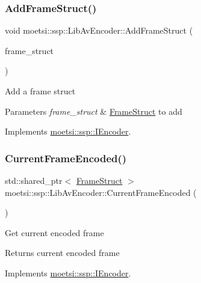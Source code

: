 \subsubsection{\texorpdfstring{Add\+Frame\+Struct()}{AddFrameStruct()}}
{\footnotesize\ttfamily void moetsi\+::ssp\+::\+Lib\+Av\+Encoder\+::\+Add\+Frame\+Struct (\begin{DoxyParamCaption}\item[{std\+::shared\+\_\+ptr$<$ \hyperlink{structmoetsi_1_1ssp_1_1FrameStruct}{Frame\+Struct} $>$ \&}]{frame\+\_\+struct }\end{DoxyParamCaption})\hspace{0.3cm}{\ttfamily [virtual]}}

Add a frame struct 
\begin{DoxyParams}{Parameters}
{\em frame\+\_\+struct} & \hyperlink{structmoetsi_1_1ssp_1_1FrameStruct}{Frame\+Struct} to add \\
\hline
\end{DoxyParams}


Implements \hyperlink{classmoetsi_1_1ssp_1_1IEncoder_a8c223ec82fdd30ee8ee75157306054ec}{moetsi\+::ssp\+::\+I\+Encoder}.

\mbox{\label{classmoetsi_1_1ssp_1_1LibAvEncoder_aedb37703d73b55f1389a122d2ecbe923}} 
\subsubsection{\texorpdfstring{Current\+Frame\+Encoded()}{CurrentFrameEncoded()}}
{\footnotesize\ttfamily std\+::shared\+\_\+ptr$<$ \hyperlink{structmoetsi_1_1ssp_1_1FrameStruct}{Frame\+Struct} $>$ moetsi\+::ssp\+::\+Lib\+Av\+Encoder\+::\+Current\+Frame\+Encoded (\begin{DoxyParamCaption}{ }\end{DoxyParamCaption})\hspace{0.3cm}{\ttfamily [virtual]}}

Get current encoded frame \begin{DoxyReturn}{Returns}
current encoded frame 
\end{DoxyReturn}


Implements \hyperlink{classmoetsi_1_1ssp_1_1IEncoder_a178d117518e7c7007414ea9c82bd3ed6}{moetsi\+::ssp\+::\+I\+Encoder}.

